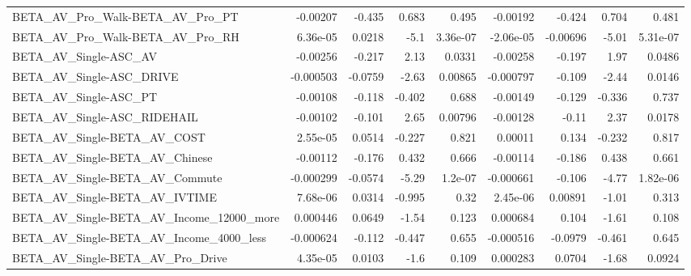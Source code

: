 \begin{tabular}{lrrrrrrrr}
BETA\_AV\_Pro\_Walk-BETA\_AV\_Pro\_PT                    &    -0.00207 &       -0.435 &     0.683 &    0.495 &   -0.00192 &      -0.424 &        0.704 &         0.481 \\
BETA\_AV\_Pro\_Walk-BETA\_AV\_Pro\_RH                    &    6.36e-05 &       0.0218 &      -5.1 & 3.36e-07 &  -2.06e-05 &    -0.00696 &        -5.01 &      5.31e-07 \\
BETA\_AV\_Single-ASC\_AV                              &    -0.00256 &       -0.217 &      2.13 &   0.0331 &   -0.00258 &      -0.197 &         1.97 &        0.0486 \\
BETA\_AV\_Single-ASC\_DRIVE                           &   -0.000503 &      -0.0759 &     -2.63 &  0.00865 &  -0.000797 &      -0.109 &        -2.44 &        0.0146 \\
BETA\_AV\_Single-ASC\_PT                              &    -0.00108 &       -0.118 &    -0.402 &    0.688 &   -0.00149 &      -0.129 &       -0.336 &         0.737 \\
BETA\_AV\_Single-ASC\_RIDEHAIL                        &    -0.00102 &       -0.101 &      2.65 &  0.00796 &   -0.00128 &       -0.11 &         2.37 &        0.0178 \\
BETA\_AV\_Single-BETA\_AV\_COST                        &    2.55e-05 &       0.0514 &    -0.227 &    0.821 &    0.00011 &       0.134 &       -0.232 &         0.817 \\
BETA\_AV\_Single-BETA\_AV\_Chinese                     &    -0.00112 &       -0.176 &     0.432 &    0.666 &   -0.00114 &      -0.186 &        0.438 &         0.661 \\
BETA\_AV\_Single-BETA\_AV\_Commute                     &   -0.000299 &      -0.0574 &     -5.29 &  1.2e-07 &  -0.000661 &      -0.106 &        -4.77 &      1.82e-06 \\
BETA\_AV\_Single-BETA\_AV\_IVTIME                      &    7.68e-06 &       0.0314 &    -0.995 &     0.32 &   2.45e-06 &     0.00891 &        -1.01 &         0.313 \\
BETA\_AV\_Single-BETA\_AV\_Income\_12000\_more           &    0.000446 &       0.0649 &     -1.54 &    0.123 &   0.000684 &       0.104 &        -1.61 &         0.108 \\
BETA\_AV\_Single-BETA\_AV\_Income\_4000\_less            &   -0.000624 &       -0.112 &    -0.447 &    0.655 &  -0.000516 &     -0.0979 &       -0.461 &         0.645 \\
BETA\_AV\_Single-BETA\_AV\_Pro\_Drive                   &    4.35e-05 &       0.0103 &      -1.6 &    0.109 &   0.000283 &      0.0704 &        -1.68 &        0.0924 \\

\end{tabular}
